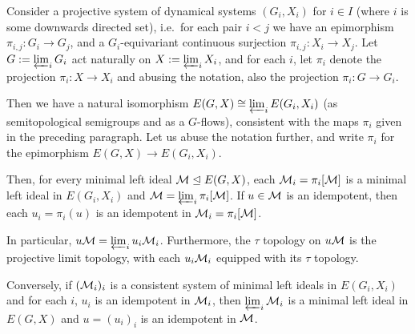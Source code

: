 	
	\begin{lem}
		\label{lem:projlim_ellis}
		Consider a projective system of dynamical systems $(G_i,X_i)$ for $i\in I$ (where $i$ is some downwards directed set), i.e.\ for each pair $i<j$ we have an epimorphism $\pi_{i,j}\colon G_i\to G_j$, and a $G_i$-equivariant continuous surjection $\pi_{i,j}\colon X_i\to X_j$. Let $G:=\varprojlim_i G_i$ act naturally on $X:=\varprojlim_i X_i$, and for each $i$, let $\pi_i$ denote the projection $\pi_i\colon X\to X_i$ and abusing the notation, also the projection $\pi_i\colon G\to G_i$.
		
		Then we have a natural isomorphism $E(G,X)\cong \varprojlim_i E(G_i,X_i)$ (as semitopological semigroups and as a $G$-flows), consistent with the maps $\pi_i$ given in the preceding paragraph. Let us abuse the notation further, and write $\pi_i$ for the epimorphism $E(G,X)\to E(G_i,X_i)$.
		
		Then, for every minimal left ideal ${\mathcal M} \trianglelefteq E(G,X)$, each ${\mathcal M}_i=\pi_i[{\mathcal M}]$ is a minimal left ideal in $E(G_i,X_i)$ and ${\mathcal M}=\varprojlim_i \pi_i[{\mathcal M}]$. If $u\in {\mathcal M}$ is an idempotent, then each $u_i=\pi_i(u)$ is an idempotent in ${\mathcal M}_i=\pi_i[{\mathcal M}]$.
		
		In particular, $u{\mathcal M}=\varprojlim_i u_i{\mathcal M}_i$. Furthermore, the $\tau$ topology on $u{\mathcal M}$ is the projective limit topology, with each $u_i{\mathcal M}_i$ equipped with its $\tau$ topology.
		
		Conversely, if $({\mathcal M}_i)_i$ is a consistent system of minimal left ideals in $E(G_i,X_i)$ and for each $i$, $u_i$ is an idempotent in ${\mathcal M}_i$, then $\varprojlim_i {\mathcal M}_i$ is a minimal left ideal in $E(G,X)$ and $u=(u_i)_i$ is an idempotent in ${\mathcal M}$.
	\end{lem}
